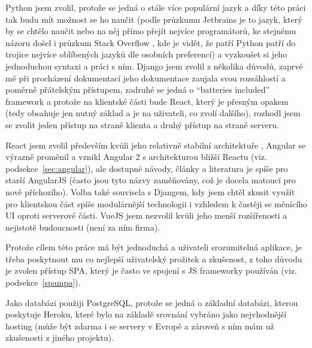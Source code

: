     Python jsem zvolil, protože se jedná o stále více populární jazyk a díky této práci tak budu mít možnost se ho naučit (podle průzkumu Jetbrains \cite{jetbrains-stats} je to jazyk, který by se chtělo naučit nebo na něj přímo přejít nejvíce programátorů, ke stejnému názoru došel i průzkum Stack Overflow \cite{stack-stats18}, kde je vidět, že patří Python patří do trojice nejvíce oblíbených jazyků dle osobních preferencí) a vyzkoušet si jeho jednoduchou syntaxi a práci s ním. Django jsem zvolil z několika důvodů, zaprvé mě při procházení dokumentací jeho dokumentace zaujala svou rozsáhlostí a poměrně přátelským přístupem, zadruhé se jedná o \enquote{batteries included} framework a protože na klientské části bude React, který je přesným opakem (tedy obsahuje jen nutný základ a je na uživateli, co zvolí dalšího), rozhodl jsem se zvolit jeden přístup na straně klienta a druhý přístup na straně serveru.
    
    React jsem zvolil především kvůli jeho relativně stabilní architektuře \cite{js-fw2}, Angular se výrazně proměnil a vznikl Angular 2 s architekturou bližší Reactu (viz. podsekce~\ref{sec:angular}), ale dostupné návody, články a literatura je spíše pro starší AngularJS (často jsou tyto názvy zaměňovány, což je docela matoucí pro nově příchozího). Volba také souvisela s Djangem, kdy jsem chtěl zkusit využít pro klientskou část spíše modulárnější technologii i vzhledem k častěji se měnícího UI oproti serverové části. VueJS jsem nezvolil kvůli jeho menší rozšířenosti a nejistotě budoucnosti (není za ním firma).
    
    Protože cílem této práce má být jednoduchá a uživateli srozumitelná aplikace, je třeba poskytnout mu co nejlepší uživatelský prožitek a zkušenost, z toho důvodu je zvolen přístup SPA, který je často ve spojení s JS frameworky používán (viz. podsekce~\ref{spampa}).
    
    Jako databázi použiji PostgreSQL, protože se jedná o základní databázi, kterou poskytuje Heroku, které bylo na základě srovnání vybráno jako nejvhodnější hosting (může být zdarma i se servery v Evropě a zároveň s ním mám už zkušenosti z jiného projektu).